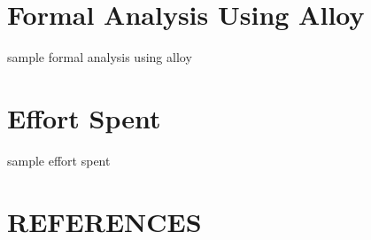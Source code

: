 \documentclass[a4paper, 10pt, oneside]{article}
\begin{document}
\section{Formal Analysis Using Alloy}
\label{analysisAndAlloy}
sample formal analysis using alloy

\section{Effort Spent}
\label{effort}
sample effort spent

\section{REFERENCES}
\label{references}
\renewcommand{\refname}{}
\vspace{-2.6em}
\nocite{*}
 

\end{document}
